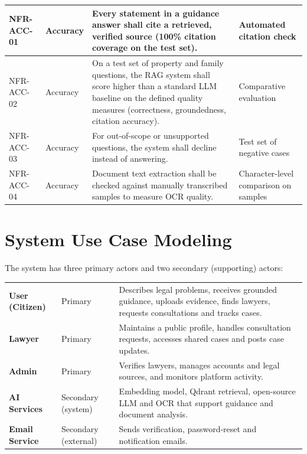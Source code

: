 \begin{longtable}{|L{1.70cm}|L{1.70cm}|L{7.76cm}|L{2.85cm}|}
NFR-ACC-01 & Accuracy & Every statement in a guidance answer shall cite a retrieved, verified source (100\% citation coverage on the test set). & Automated citation check \\ \hline
NFR-ACC-02 & Accuracy & On a test set of property and family questions, the RAG system shall score higher than a standard LLM baseline on the defined quality measures (correctness, groundedness, citation accuracy). & Comparative evaluation \\ \hline
NFR-ACC-03 & Accuracy & For out-of-scope or unsupported questions, the system shall decline instead of answering. & Test set of negative cases \\ \hline
NFR-ACC-04 & Accuracy & Document text extraction shall be checked against manually transcribed samples to measure OCR quality. & Character-level comparison on samples \\
\end{longtable}

\section{System Use Case Modeling}

The system has three primary actors and two secondary (supporting) actors:

\begin{center}
\begin{tabular}{|L{2.12cm}|L{1.76cm}|L{10.59cm}|}
\hline\headrow {} &  &  \\ \hline
\textbf{User (Citizen)} & Primary & Describes legal problems, receives grounded guidance, uploads evidence, finds lawyers, requests consultations and tracks cases. \\ \hline
\textbf{Lawyer} & Primary & Maintains a public profile, handles consultation requests, accesses shared cases and posts case updates. \\ \hline
\textbf{Admin} & Primary & Verifies lawyers, manages accounts and legal sources, and monitors platform activity. \\ \hline
\textbf{AI Services} & Secondary (system) & Embedding model, Qdrant retrieval, open-source LLM and OCR that support guidance and document analysis. \\ \hline
\textbf{Email Service} & Secondary (external) & Sends verification, password-reset and notification emails. \\ \hline
\end{tabular}
\end{center}

